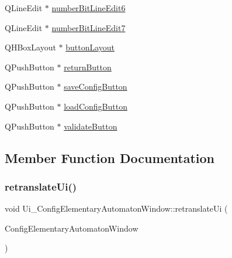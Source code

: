 \begin{DoxyCompactItemize}
Q\+Line\+Edit $\ast$ \mbox{\hyperlink{class_ui___config_elementary_automaton_window_ac5ab41fd5b024028093e5ad9b47eb27d}{number\+Bit\+Line\+Edit6}}
\item 
Q\+Line\+Edit $\ast$ \mbox{\hyperlink{class_ui___config_elementary_automaton_window_ae01a642a80a4baa1314ea4389fbdff77}{number\+Bit\+Line\+Edit7}}
\item 
Q\+H\+Box\+Layout $\ast$ \mbox{\hyperlink{class_ui___config_elementary_automaton_window_a176806c6b271e83896375ad3aea4b26d}{button\+Layout}}
\item 
Q\+Push\+Button $\ast$ \mbox{\hyperlink{class_ui___config_elementary_automaton_window_ada96cc83974fe3ba241f593a36f1470c}{return\+Button}}
\item 
Q\+Push\+Button $\ast$ \mbox{\hyperlink{class_ui___config_elementary_automaton_window_ad9b1e4c11becd3de7e8d88730afa23c4}{save\+Config\+Button}}
\item 
Q\+Push\+Button $\ast$ \mbox{\hyperlink{class_ui___config_elementary_automaton_window_a56c125f20784c255957054f89a4abdef}{load\+Config\+Button}}
\item 
Q\+Push\+Button $\ast$ \mbox{\hyperlink{class_ui___config_elementary_automaton_window_a47c64ea40d893b93ea778ff8f93863ab}{validate\+Button}}
\end{DoxyCompactItemize}


\subsection{Member Function Documentation}
\mbox{\label{class_ui___config_elementary_automaton_window_af25feef5d9603ef556e055cffb7606ea}} 
\subsubsection{\texorpdfstring{retranslate\+Ui()}{retranslateUi()}}
{\footnotesize\ttfamily void Ui\+\_\+\+Config\+Elementary\+Automaton\+Window\+::retranslate\+Ui (\begin{DoxyParamCaption}\item[{Q\+Widget $\ast$}]{Config\+Elementary\+Automaton\+Window }\end{DoxyParamCaption})\hspace{0.3cm}{\ttfamily [inline]}}

